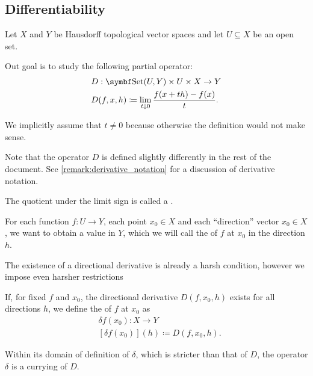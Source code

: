 \subsection{Differentiability}\label{subsec:differentiability}

Let \( X \) and \( Y \) be Hausdorff topological vector spaces and let \( U \subseteq X \) be an open set.

\begin{definition}\label{def:differentiability}
  Out goal is to study the following partial operator:
  \begin{align}\label{def:differentiability/partial_operator}
    &D: \Cat{Set}(U, Y) \times U \times X \to Y \\
    &D(f, x, h) \coloneqq \lim_{t \downarrow 0} \frac {f(x + th) - f(x)} t.
  \end{align}

  We implicitly assume that \( t \neq 0 \) because otherwise the definition would not make sense.

  Note that the operator \( D \) is defined slightly differently in the rest of the document. See \cref{remark:derivative_notation} for a discussion of derivative notation.

  The quotient under the limit sign is called a .

  For each function \( f: U \to Y \), each point \( x_0 \in X \) and each \enquote{direction} vector \( x_0 \in X \), we want to obtain a value in \( Y \), which we will call the  of \( f \) at \( x_0 \) in the direction \( h \).

  The existence of a directional derivative is already a harsh condition, however we impose even harsher restrictions

  \begin{defenum}
    \cite[section 0.2.1]{Йоффе1974} If, for fixed \( f \) and \( x_0 \), the directional derivative \( D(f, x_0, h) \) exists for all directions \( h \), we define the  of \( f \) at \( x_0 \) as
    \begin{align*}
      &\delta f(x_0): X \to Y \\
      &[\delta f(x_0)](h) \coloneqq D(f, x_0, h).
    \end{align*}

    Within its domain of definition of \( \delta \), which is stricter than that of \( D \), the operator \( \delta \) is a currying of \( D \).


\end{defenum}
\end{definition}
